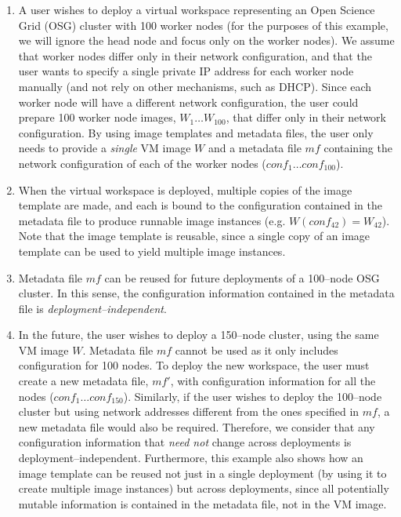 \begin{enumerate}
\item A user wishes to deploy a virtual workspace representing an Open Science Grid (OSG) cluster with 100 worker nodes (for the purposes of this example, we will ignore the head node and focus only on the worker nodes). We assume that worker nodes differ only in their network configuration, and that the user wants to specify a single private IP address for each worker node manually (and not rely on other mechanisms, such as DHCP). Since each worker node will have a different network configuration, the user could prepare 100 worker node images, $W_1\ldots W_{100}$, that differ only in their network configuration. By using image templates and metadata files, the user only needs to provide a \emph{single} VM image $W$ and a metadata file $mf$ containing the network configuration of each of the worker nodes ($conf_1\ldots conf_{100}$).
\item When the virtual workspace is deployed, multiple copies of the image template are made, and each is bound to the configuration contained in the metadata file to produce runnable image instances (e.g. $W(conf_{42})=W_{42}$). Note that the image template is reusable, since a single copy of an image template can be used to yield multiple image instances.
\item Metadata file $mf$ can be reused for future deployments of a 100--node OSG cluster. In this sense, the configuration information contained in the metadata file is \emph{deployment--independent}.
\item In the future, the user wishes to deploy a 150--node cluster, using the same VM image $W$. Metadata file $mf$ cannot be used as it only includes configuration for 100 nodes. To deploy the new workspace, the user must create a new metadata file, $mf'$, with configuration information for all the nodes ($conf_1\ldots conf_{150}$). Similarly, if the user wishes to deploy the 100--node cluster but using network addresses different from the ones specified in $mf$, a new metadata file would also be required. Therefore, we consider that any configuration information that \emph{need not} change across deployments is deployment--independent. Furthermore, this example also shows how an image template can be reused not just in a single deployment (by using it to create multiple image instances) but across deployments, since all potentially mutable information is contained in the metadata file, not in the VM image.
\end{enumerate}

